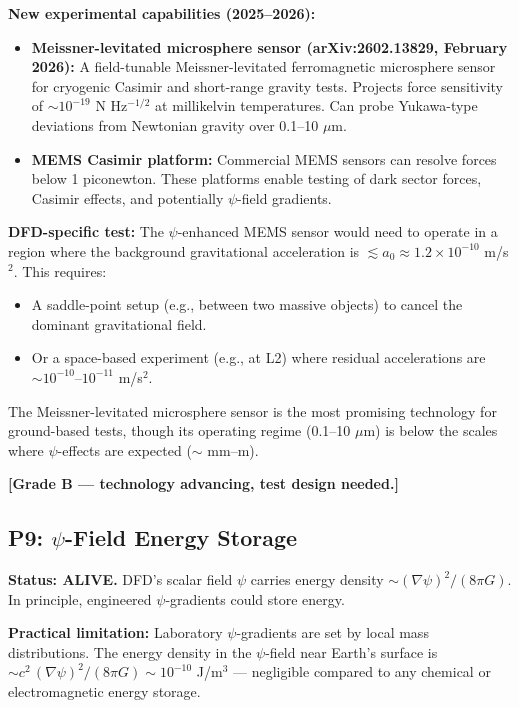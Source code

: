 \documentclass[11pt]{article}
\newcommand{\ee}[1]{\times 10^{#1}}
\newcommand{\aM}{a_0}
\begin{document}
\textbf{New experimental capabilities (2025--2026):}
\begin{itemize}
  \item \textbf{Meissner-levitated microsphere sensor (arXiv:2602.13829,
    February 2026):} A field-tunable Meissner-levitated ferromagnetic
    microsphere sensor for cryogenic Casimir and short-range gravity tests.
    Projects force sensitivity of $\sim 10^{-19}$ N Hz$^{-1/2}$ at
    millikelvin temperatures. Can probe Yukawa-type deviations from
    Newtonian gravity over 0.1--10 $\mu$m.
  \item \textbf{MEMS Casimir platform:} Commercial MEMS sensors can
    resolve forces below 1 piconewton. These platforms enable
    testing of dark sector forces, Casimir effects, and potentially
    $\psi$-field gradients.
\end{itemize}

\textbf{DFD-specific test:} The $\psi$-enhanced MEMS sensor would need
to operate in a region where the background gravitational acceleration
is $\lesssim \aM \approx 1.2 \ee{-10}$ m/s$^2$. This requires:
\begin{itemize}
  \item A saddle-point setup (e.g., between two massive objects) to
    cancel the dominant gravitational field.
  \item Or a space-based experiment (e.g., at L2) where residual
    accelerations are $\sim 10^{-10}$--$10^{-11}$ m/s$^2$.
\end{itemize}

The Meissner-levitated microsphere sensor is the most promising
technology for ground-based tests, though its operating regime
(0.1--10 $\mu$m) is below the scales where $\psi$-effects are
expected ($\sim$ mm--m).

\textbf{[Grade B --- technology advancing, test design needed.]}

\subsection{P9: $\psi$-Field Energy Storage}

\textbf{Status: ALIVE.} DFD's scalar field $\psi$ carries energy
density $\sim (\nabla\psi)^2/(8\pi G)$. In principle, engineered
$\psi$-gradients could store energy.

\textbf{Practical limitation:} Laboratory $\psi$-gradients are set by
local mass distributions. The energy density in the $\psi$-field near
Earth's surface is $\sim c^2\,(\nabla\psi)^2/(8\pi G) \sim 10^{-10}$
J/m$^3$ --- negligible compared to any chemical or electromagnetic
energy storage.
\end{document}

